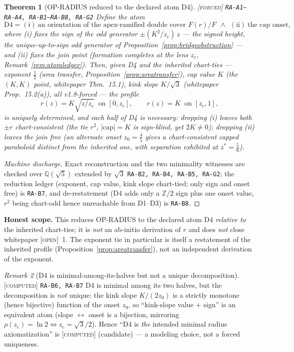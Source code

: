 \documentclass[11pt]{article}
\newcommand{\tagF}{\textcolor{cF}{\textsc{[forced]}}}
\newcommand{\tagC}{\textcolor{cC}{\textsc{[computed]}}}
\newcommand{\tagO}{\textcolor{cO}{\textsc{[open]}}}
\newcommand{\hx}[1]{\textcolor{cC}{\footnotesize\texttt{#1}}}
\newcommand{\Q}{\mathbb{Q}}
\newcommand{\Z}{\mathbb{Z}}
\theoremstyle{plain}
\newtheorem{theorem}{Theorem}[section]
\theoremstyle{definition}
\theoremstyle{remark}
\newtheorem{remark}[theorem]{Remark}
\begin{document}
\begin{theorem}[OP-RADIUS reduced to the declared atom D4]\label{thm:d4reduction}\tagF{} \hx{RA-A1--RA-A4, RA-B1--RA-B8, RA-G2}
Define the atom
\[
\text{D4}=(\text{i})\ \text{an orientation of the apex-ramified double cover }
F(r)/F\ \ \wedge\ \ (\text{ii})\ \text{the cap onset,}
\]
where (i) fixes the sign of the odd generator $\pm(K^2/z_c)\,z$ --- the signed
height, the unique-up-to-sign odd generator of
Proposition~\ref{prop:bridgeobstruction} --- and (ii) fixes the join point
(formation completes at the lens $z_c$, Remark~\ref{rem:atomledger}). Then,
\emph{given} D4 and the inherited chart-ties --- exponent $\tfrac12$ (area
transfer, Proposition~\ref{prop:areatransfer}), cap value $K$ (the $(K,K)$ point,
whitepaper Thm.~15.1), kink slope $K/\sqrt3$ (whitepaper Prop.~15.2(a)), all
v1.8-forced --- the profile
\[
r(z)=K\sqrt{z/z_c}\ \text{ on }[0,z_c],\qquad r(z)=K\ \text{ on }[z_c,1],
\]
is \emph{uniquely} determined, and each half of D4 is \emph{necessary}: dropping
(i) leaves both $\pm r$ chart-consistent (the tie $r^2$, $|\mathrm{cap}|=K$ is
sign-blind, yet $2K\neq0$); dropping (ii) leaves the join free (an alternate
onset $z_0=\tfrac45$ gives a chart-consistent capped paraboloid distinct from the
inherited one, with separation exhibited at $z^*=\tfrac56$).
\end{theorem}

\begin{proof}[Machine discharge]
Exact reconstruction and the two minimality witnesses are checked over
$\Q(\sqrt5)$ extended by $\sqrt3$ \hx{RA-B2, RA-B4, RA-B5, RA-G2}; the reduction
ledger (exponent, cap value, kink slope chart-tied; only sign and onset free) is
\hx{RA-B7}, and de-restatement (D4 adds only a $\Z/2$ sign plus one onset value,
$r^2$ being chart-odd hence unreachable from D1--D3) is \hx{RA-B8}.
\end{proof}

\smallskip\noindent
\textbf{Honest scope.} This reduces OP-RADIUS to the declared atom D4
\emph{relative to} the inherited chart-ties; it is \emph{not} an ab-initio
derivation of $r$ and does \emph{not} close whitepaper \tagO{}~1. The exponent
tie in particular is itself a restatement of the inherited profile
(Proposition~\ref{prop:areatransfer}), not an independent derivation of the
exponent.

\begin{remark}[D4 is minimal-among-its-halves but not a unique decomposition]\label{rem:d4candidate}\tagC{} \hx{RA-B6, RA-B7}
D4 is minimal among its two halves, but the decomposition is \emph{not} unique:
the kink slope $K/(2z_0)$ is a strictly monotone (hence bijective) function of
the onset $z_0$, so ``kink-slope value $+$ sign'' is an equivalent atom (slope
$\leftrightarrow$ onset is a bijection, mirroring $\rho(z_c)=\ln2\iff
z_c=\sqrt3/2$). Hence ``D4 is \emph{the} intended minimal radius axiomatization''
is \tagC{} (candidate) --- a modeling choice, not a forced uniqueness.
\end{remark}
\end{document}
